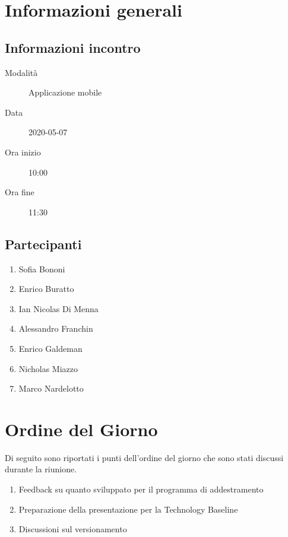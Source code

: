\documentclass{article}
\begin{document}


\section{Informazioni generali}%
\label{sec:informazioni_generali}

\subsection{Informazioni incontro}%
\label{sub:informazioni_incontro}

\begin{description}
  \item[Modalità] Applicazione mobile 
  \item[Data] 2020-05-07
  \item[Ora inizio] 10:00
  \item[Ora fine] 11:30
\end{description}

\subsection{Partecipanti}%
\label{sub:partecipanti}

\begin{enumerate}
  \item Sofia Bononi
  \item Enrico Buratto
  \item Ian Nicolas Di Menna
  \item Alessandro Franchin
  \item Enrico Galdeman
  \item Nicholas Miazzo
  \item Marco Nardelotto
\end{enumerate}

\section{Ordine del Giorno}%
\label{ordine_del_giorno}
Di seguito sono riportati i punti dell'ordine del giorno che sono stati discussi durante la riunione.
\begin{enumerate}
  \item Feedback su quanto sviluppato per il programma di addestramento
  \item Preparazione della presentazione per la Technology Baseline
  \item Discussioni sul versionamento
\end{enumerate}
\end{document}
